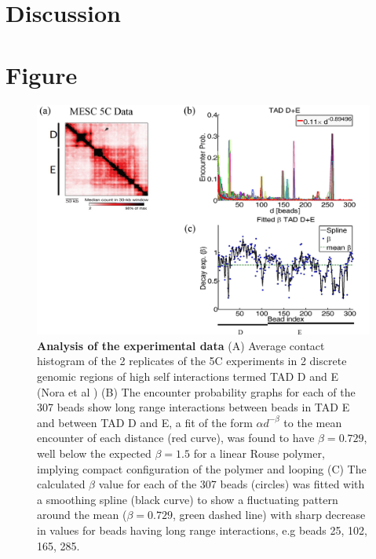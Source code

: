 \documentclass[12pt]{article}
\begin{document}


\section{Discussion}\label{section_discussion}

\section{Figure}\label{section_figures}

\begin{figure}[H]
\includegraphics[scale=0.5]{Figure01_AnalysisOfTheExperimentalData}
\caption{\textbf{Analysis of the experimental data} (A) Average contact histogram of the 2 replicates of the 5C experiments in 2 discrete genomic regions of high self interactions termed TAD D and E (Nora et al \cite{Nora2012}) (B) The encounter probability graphs for each of the 307 beads show long range interactions between beads in TAD E and between TAD D and E, a fit of the form $\alpha d ^{-\beta}$ to the mean encounter of each distance (red curve), was found to have $\beta=0.729$, well below the expected $\beta=1.5$ for a linear Rouse polymer, implying compact configuration of the polymer and looping (C) The calculated $\beta$ value for each of the 307 beads (circles) was fitted with a smoothing spline (black curve) to show a fluctuating pattern around the mean ($\beta=0.729$, green dashed line) with sharp decrease in values for beads having long range interactions, e.g beads 25, 102, 165, 285.}
\label{figure_TADDAndENoraEtAl2012}
\end{figure}
\end{document}
